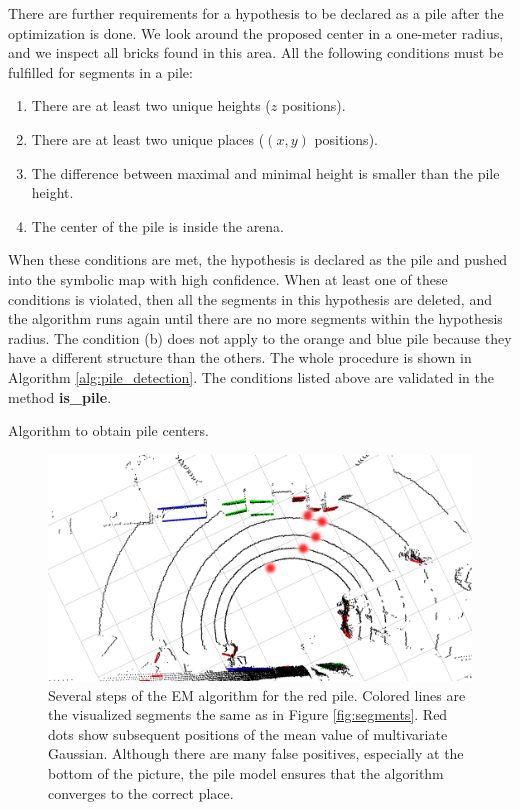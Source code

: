 There are further requirements for a hypothesis to be declared as a pile after the optimization is done. We look around the proposed center in a one-meter radius, and we inspect all bricks found in this area. All the following conditions must be fulfilled for segments in a pile:
\begin{enumerate}[label=(\alph*)]
\item There are at least two unique heights ($z$ positions).
\item There are at least two unique places ($(x,y)$ positions).
\item The difference between maximal and minimal height is smaller than the pile height.
\item The center of the pile is inside the arena.
\end{enumerate}
When these conditions are met, the hypothesis is declared as the pile and pushed into the symbolic map with high confidence. When at least one of these conditions is violated, then all the segments in this hypothesis are deleted, and the algorithm runs again until there are no more segments within the hypothesis radius. The condition (b) does not apply to the orange and blue pile because they have a different structure than the others. The whole procedure is shown in Algorithm \ref{alg:pile_detection}. The conditions listed above are validated in the method \textbf{is\_pile}.
\begin{algorithm}[]
 \caption{Algorithm to obtain pile centers.}
 \label{alg:pile_detection}
\end{algorithm}

\begin{figure}[H]
\centering
\includegraphics[scale=0.3]{fig/em_algo.png}
\caption[Em Algorithm in pile detector]{Several steps of the EM algorithm for the red pile. Colored lines are the visualized segments the same as in Figure \ref{fig:segments}. Red dots show subsequent positions of the mean value of multivariate Gaussian. Although there are many false positives, especially at the bottom of the picture, the pile model ensures that the algorithm converges to the correct place.}
\label{fig:em}
\end{figure}


